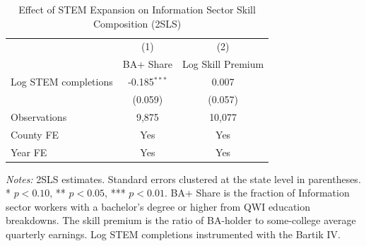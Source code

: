 \begin{table}[H]
\centering
\caption{Effect of STEM Expansion on Information Sector Skill Composition (2SLS)}
\label{tab:skill}
\begin{threeparttable}
\begin{tabular}{lcc}
\toprule
 & (1) & (2) \\
 & BA+ Share & Log Skill Premium \\
\midrule
Log STEM completions & -0.185$^{***}$ & 0.007 \\
 & (0.059) & (0.057) \\
\addlinespace
Observations & 9,875 & 10,077 \\
County FE & Yes & Yes \\
Year FE & Yes & Yes \\
\bottomrule
\end{tabular}
\begin{tablenotes}[flushleft]
\small
\item \textit{Notes:} 2SLS estimates. Standard errors clustered at the state level in parentheses. * $p<0.10$, ** $p<0.05$, *** $p<0.01$. BA+ Share is the fraction of Information sector workers with a bachelor's degree or higher from QWI education breakdowns. The skill premium is the ratio of BA-holder to some-college average quarterly earnings. Log STEM completions instrumented with the Bartik IV.
\end{tablenotes}
\end{threeparttable}
\end{table}

